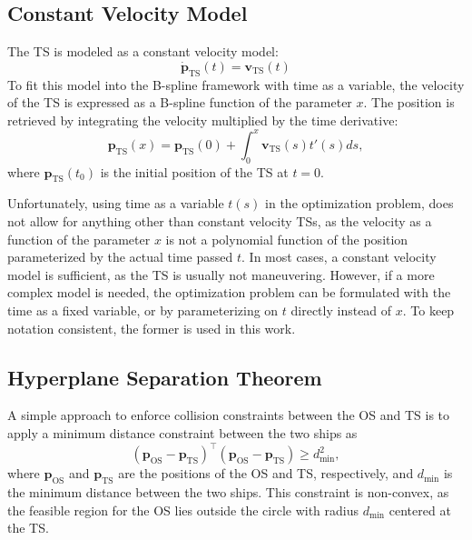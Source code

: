 \subsection{Constant Velocity Model}\label{sec:constant-velocity-model}
The \acrshort{TS} is modeled as a constant velocity model:
\begin{equation}
    \dot{\mathbf{p}}_{\text{TS}}(t) = \mathbf{v}_{\text{TS}}(t)
\end{equation}
To fit this model into the B-spline framework with time as a variable, the velocity of the \acrshort{TS} is expressed as a B-spline function of the parameter $x$. The position is retrieved by integrating the velocity multiplied by the time derivative:
\begin{equation}\label{eq:ts-constant-velocity}
    \mathbf{p}_{\text{TS}}(x) = \mathbf p_\text{TS}(0) + \int_0^x \mathbf{v}_{\text{TS}}(s) t'(s) ds,
\end{equation}
where $\mathbf p_\text{TS}(t_0)$ is the initial position of the \acrshort{TS} at $t=0$. 

Unfortunately, using time as a variable $t(s)$ in the optimization problem, does not allow for anything other than constant velocity TSs, as the velocity as a function of the parameter $x$ is not a polynomial function of the position parameterized by the actual time passed $t$. In most cases, a constant velocity model is sufficient, as the \acrshort{TS} is usually not maneuvering. However, if a more complex model is needed, the optimization problem can be formulated with the time as a fixed variable, or by parameterizing on $t$ directly instead of $x$. To keep notation consistent, the former is used in this work.

\subsection{Hyperplane Separation Theorem}
A simple approach to enforce collision constraints between the \acrshort{OS} and \acrshort{TS} is to apply a minimum distance constraint between the two ships as
\begin{equation}\label{eq:minimum-distance}
    (\mathbf p_{\text{OS}} - \mathbf p_{\text{TS}})^\top (\mathbf p_{\text{OS}} - \mathbf p_{\text{TS}}) \geq d_{\text{min}}^2,
\end{equation}
where $\mathbf p_{\text{OS}}$ and $\mathbf p_{\text{TS}}$ are the positions of the OS and TS, respectively, and $d_{\text{min}}$ is the minimum distance between the two ships. This constraint is non-convex, as the feasible region for the OS lies outside the circle with radius $d_{\text{min}}$ centered at the TS.

